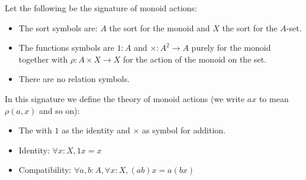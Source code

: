 \begin{dfn}
    Let the following be the signature of monoid actions:
    \begin{itemize}
        \item The sort symbols are: $A$ the sort for the 
            monoid and $X$ the sort for the $A$-set.
        \item The functions symbols are $1 : A$ and 
            $\times: A^2 \to A$ purely for the monoid
            together with $\rho : A \times X \to X$ 
            for the action of the monoid on the set.
        \item There are no relation symbols.
    \end{itemize}
    
    In this signature we define the theory of monoid actions
    (we write $a x$ to mean $\rho(a,x)$ and so on):
    \begin{itemize}
        \item The  
        with $1$ as the identity and $\times$ as symbol for addition.
        \item Identity: 
        $\forall x : X, 1 x = x$
        \item Compatibility: 
        $\forall a, b : A, \forall x : X, (a b) x = a (b x)$
    \end{itemize}
\end{dfn}

